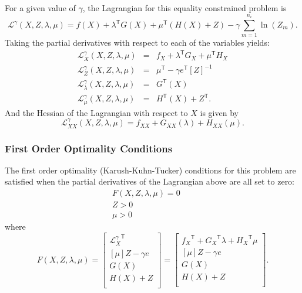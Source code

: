 \documentclass[12pt]{article}
\newcommand{\trans}[1]{{#1}^{\ensuremath{\mathsf{T}}}}  %
\newcommand{\diag}[1]{\left[{#1}\right]}                %
\numberwithin{equation}{section}
\numberwithin{table}{section}
\numberwithin{figure}{section}
\begin{document}
\begin{appendices}
For a given value of $\gamma$, the Lagrangian for this equality constrained problem is
\begin{equation}
\mathcal{L}^\gamma(X, Z, \lambda, \mu) = f(X) + \trans{\lambda} G(X) + \trans{\mu} (H(X) + Z) - \gamma \sum_{m=1}^{n_i} \ln(Z_m).
\label{eq:L}
\end{equation}
Taking the partial derivatives with respect to each of the variables yields:
\begin{eqnarray}
\mathcal{L}^\gamma_X(X, Z, \lambda, \mu) &=& f_X + \trans{\lambda} G_X + \trans{\mu} H_X \\
\mathcal{L}^\gamma_Z(X, Z, \lambda, \mu) &=& \trans{\mu} - \gamma \trans{e} \diag{Z}^{-1} \\
\mathcal{L}^\gamma_\lambda(X, Z, \lambda, \mu) &=& \trans{G}(X) \\
\mathcal{L}^\gamma_\mu(X, Z, \lambda, \mu) &=& \trans{H}(X) + \trans{Z}.
\end{eqnarray}
And the Hessian of the Lagrangian with respect to $X$ is given by
\begin{equation}
\mathcal{L}^\gamma_{XX}(X, Z, \lambda, \mu) = f_{XX} + G_{XX}(\lambda) + H_{XX}(\mu).
\end{equation}

\subsubsection{First Order Optimality Conditions}

The first order optimality (Karush-Kuhn-Tucker) conditions for this problem are satisfied when the partial derivatives of the Lagrangian above are all set to zero:
\begin{eqnarray}
F(X, Z, \lambda, \mu) = 0 && \\
Z > 0 && \\
\mu > 0 &&
\end{eqnarray}
where
\begin{equation}
F(X, Z, \lambda, \mu) = \left[\begin{array}{c}
\trans{\mathcal{L}^\gamma_X} \\
\diag{\mu} Z - \gamma e \\
G(X) \\
H(X) + Z \\
\end{array}\right] = \left[\begin{array}{c}
\trans{f_X} + \trans{G_X} \lambda + \trans{H_X} \mu \\
\diag{\mu} Z - \gamma e \\
G(X) \\
H(X) + Z \\
\end{array}\right].
\end{equation}


\end{appendices}
\end{document}
